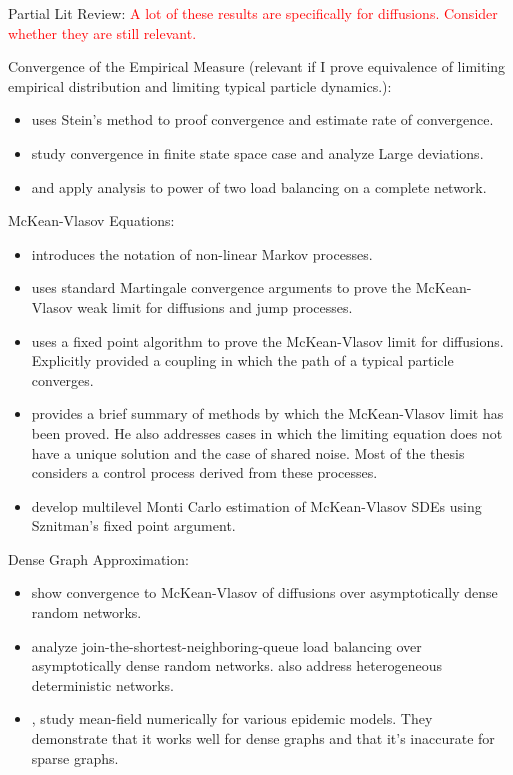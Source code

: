 \documentclass[12pt]{article}
\newcommand{\tr}{\textcolor{red}}
\begin{document}
Partial Lit Review: \tr{A lot of these results are specifically for diffusions. Consider whether they are still relevant.}

Convergence of the Empirical Measure (relevant if I prove equivalence of limiting empirical distribution and limiting typical particle dynamics.):

\begin{itemize}
\item \cite{Yin15} uses Stein's method to proof convergence and estimate rate of convergence.

\item \cite{DupRamWu16} study convergence in finite state space case and analyze Large deviations.

\item \cite{VveDobKar96} and \cite{Mit01} apply analysis to power of two load balancing on a complete network. 
\end{itemize}

McKean-Vlasov Equations:

\begin{itemize}
\item \cite{Mck66} introduces the notation of non-linear Markov processes.

\item \cite{Oel84} uses standard Martingale convergence arguments to prove the McKean-Vlasov weak limit for diffusions and jump processes.

\item \cite{Szn91} uses a fixed point algorithm to prove the McKean-Vlasov limit for diffusions. Explicitly provided a coupling in which the path of a typical particle converges.

\item \cite{Lac15} provides a brief summary of methods by which the McKean-Vlasov limit has been proved. He also addresses cases in which the limiting equation does not have a unique solution and the case of shared noise. Most of the thesis considers a control process derived from these processes.

\item \cite{SzpTanTse17} develop multilevel Monti Carlo estimation of McKean-Vlasov SDEs using Sznitman's fixed point argument.
\end{itemize}

Dense Graph Approximation:

\begin{itemize}
\item \cite{BhaBudWu17} show convergence to McKean-Vlasov of diffusions over asymptotically dense random networks.

\item \cite{MukBorLee17} analyze join-the-shortest-neighboring-queue load balancing over asymptotically dense random networks. \cite{BudMukWu17} also address heterogeneous deterministic networks.

\item \cite{MieBov15},\cite{GreKisKao06} study mean-field numerically for various epidemic models. They demonstrate that it works well for dense graphs and that it's inaccurate for sparse graphs.
\end{itemize}
\end{document}
